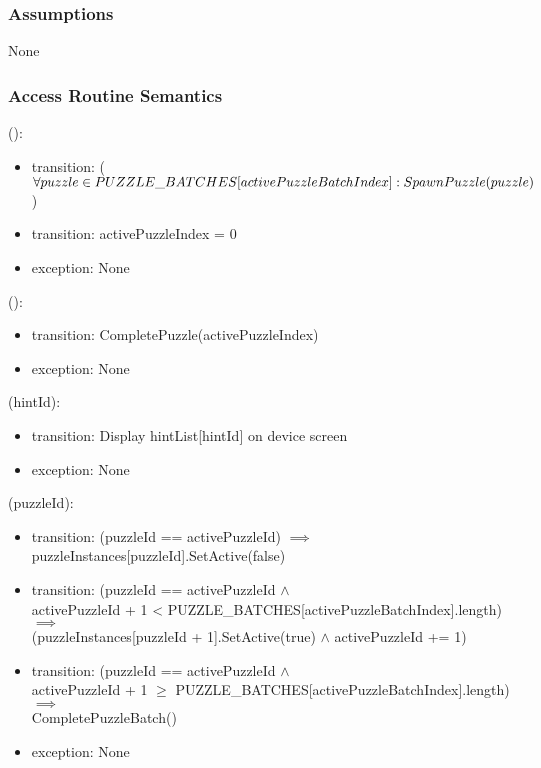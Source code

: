 \documentclass[12pt, titlepage]{article}
\begin{document}
\subsubsection{Assumptions}

None

\subsubsection{Access Routine Semantics}

():
\begin{itemize}
\item transition: ($\forall puzzle \in PUZZLE\_BATCHES[activePuzzleBatchIndex] : \\SpawnPuzzle(puzzle)$)
\item transition: activePuzzleIndex = 0
\item exception: None
\end{itemize}

():
\begin{itemize}
\item transition: CompletePuzzle(activePuzzleIndex)
\item exception: None
\end{itemize}

(hintId):
\begin{itemize}
\item transition: Display hintList[hintId] on device screen
\item exception: None
\end{itemize}

(puzzleId):
\begin{itemize}
\item transition: (puzzleId == activePuzzleId) $\implies$ \\ puzzleInstances[puzzleId].SetActive(false)
\item transition: (puzzleId == activePuzzleId $\land$\\activePuzzleId + 1 < PUZZLE\_BATCHES[activePuzzleBatchIndex].length) $\implies$ \\ (puzzleInstances[puzzleId + 1].SetActive(true) $\land$ activePuzzleId += 1)
\item transition: (puzzleId == activePuzzleId $\land$\\activePuzzleId + 1 $\geq$ PUZZLE\_BATCHES[activePuzzleBatchIndex].length) $\implies$ \\ CompletePuzzleBatch()
\item exception: None
\end{itemize}
\end{document}
